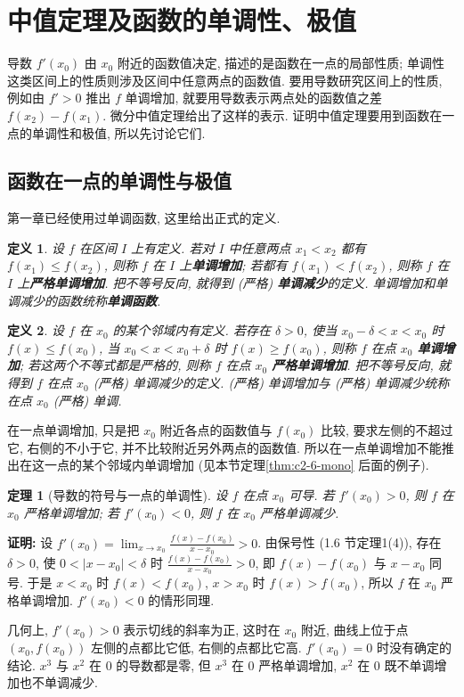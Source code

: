 \documentclass[UTF8,openany]{ctexbook}
\theoremstyle{chinesetextbook}
\newtheorem{definition}{定义}[section]
\newtheorem{theorem}{定理}[section]
\newenvironment{cnproof}{\par\indent\textbf{证明:} \ignorespaces}{\par}
\begin{document}
\section{中值定理及函数的单调性、极值}
导数 $f'(x_0)$ 由 $x_0$ 附近的函数值决定, 描述的是函数在一点的局部性质; 单调性这类区间上的性质则涉及区间中任意两点的函数值. 要用导数研究区间上的性质, 例如由 $f'>0$ 推出 $f$ 单调增加, 就要用导数表示两点处的函数值之差 $f(x_2)-f(x_1)$. 微分中值定理给出了这样的表示. 证明中值定理要用到函数在一点的单调性和极值, 所以先讨论它们.
\subsection{函数在一点的单调性与极值}
第一章已经使用过单调函数, 这里给出正式的定义.
\begin{definition}
设 $f$ 在区间 $I$ 上有定义. 若对 $I$ 中任意两点 $x_1<x_2$ 都有 $f(x_1)\le f(x_2)$, 则称 $f$ 在 $I$ 上\textbf{单调增加}; 若都有 $f(x_1)<f(x_2)$, 则称 $f$ 在 $I$ 上\textbf{严格单调增加}. 把不等号反向, 就得到 (严格) \textbf{单调减少}的定义. 单调增加和单调减少的函数统称\textbf{单调函数}.
\end{definition}
\begin{definition}
设 $f$ 在 $x_0$ 的某个邻域内有定义. 若存在 $\delta>0$, 使当 $x_0-\delta<x<x_0$ 时 $f(x)\le f(x_0)$, 当 $x_0<x<x_0+\delta$ 时 $f(x)\ge f(x_0)$, 则称 $f$ 在点 $x_0$ \textbf{单调增加}; 若这两个不等式都是严格的, 则称 $f$ 在点 $x_0$ \textbf{严格单调增加}. 把不等号反向, 就得到 $f$ 在点 $x_0$ (严格) 单调减少的定义. (严格) 单调增加与 (严格) 单调减少统称在点 $x_0$ (严格) 单调.
\end{definition}
在一点单调增加, 只是把 $x_0$ 附近各点的函数值与 $f(x_0)$ 比较, 要求左侧的不超过它, 右侧的不小于它, 并不比较附近另外两点的函数值. 所以在一点单调增加不能推出在这一点的某个邻域内单调增加 (见本节定理\ref{thm:c2-6-mono} 后面的例子).
\begin{theorem}[导数的符号与一点的单调性]\label{thm:c2-6-point}
设 $f$ 在点 $x_0$ 可导. 若 $f'(x_0)>0$, 则 $f$ 在 $x_0$ 严格单调增加; 若 $f'(x_0)<0$, 则 $f$ 在 $x_0$ 严格单调减少.
\end{theorem}
\begin{cnproof}
设 $\displaystyle f'(x_0)=\lim_{x\to x_0}\frac{f(x)-f(x_0)}{x-x_0}>0$. 由保号性 (1.6 节定理1(4)), 存在 $\delta>0$, 使 $0<|x-x_0|<\delta$ 时 $\displaystyle\frac{f(x)-f(x_0)}{x-x_0}>0$, 即 $f(x)-f(x_0)$ 与 $x-x_0$ 同号. 于是 $x<x_0$ 时 $f(x)<f(x_0)$, $x>x_0$ 时 $f(x)>f(x_0)$, 所以 $f$ 在 $x_0$ 严格单调增加. $f'(x_0)<0$ 的情形同理.
\end{cnproof}
几何上, $f'(x_0)>0$ 表示切线的斜率为正, 这时在 $x_0$ 附近, 曲线上位于点 $(x_0,f(x_0))$ 左侧的点都比它低, 右侧的点都比它高. $f'(x_0)=0$ 时没有确定的结论. $x^3$ 与 $x^2$ 在 $0$ 的导数都是零, 但 $x^3$ 在 $0$ 严格单调增加, $x^2$ 在 $0$ 既不单调增加也不单调减少.
\end{document}
